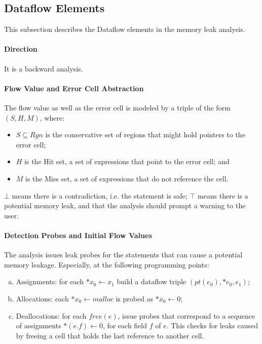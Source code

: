 \subsection{Dataflow Elements}
\label{ss:dataflow}

This subsection describes the Dataflow elements in the memory leak analysis. 

\paragraph{Direction}

It is a backward analysis.

\paragraph{Flow Value and Error Cell Abstraction}

The flow value as well as the error cell is modeled by a triple of the form 
$(S,H,M)$, where:

\begin{itemize}
  \item $S\subseteq Rgn$ is the conservative set of regions that might hold 
    pointers to the error cell;
  \item $H$ is the Hit set, a set of expressions that point to the error cell; and 
  \item $M$ is the Miss set, a set of expressions that do not reference the cell.
\end{itemize}

$\bot$ means there is a contradiction, i.e. the statement is safe; 
$\top$ means there is a potential memory leak, and that the analysis should 
prompt a warning to the user.

\paragraph{Detection Probes and Initial Flow Values}

The analysis issues leak probes for the statements that can cause a potential 
memory leakage. Especially, at the following programming points:

\begin{enumerate}[(a)]
  \item Assignments: for each $*x_0\gets x_1$ build a dataflow triple 
    $(pt(e_0),{*e_0},{e_1})$;
  \item Allocations: each $*x_0\gets malloc$ is probed as $*x_0\gets 0$;
  \item Deallocations: for each $free(e)$, issue probes that correspond to a 
    sequence of assignments $*(e.f)\gets 0$, for each field $f$ of $e$. This 
    checks for leaks caused by freeing a cell that holds the last reference 
    to another cell.
\end{enumerate}

